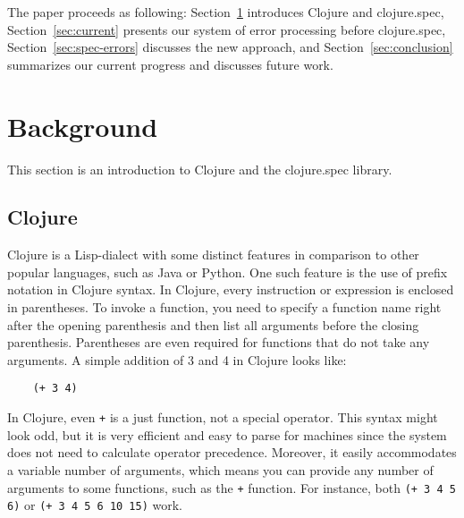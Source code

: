 \documentclass[12pt]{article}
\newcommand{\comment}[1]{{\bf \tt  {#1}}}
\newcommand{\emcomment}[1]{\textcolor{ForestGreen}{\comment{Elena: {#1}}}}
\newcommand{\tscomment}[1]{\textcolor{Teal}{\comment{Tony: {#1}}}}
\begin{document}
The paper proceeds as following: Section~\ref{sec:background} introduces Clojure and clojure.spec, 
Section~\ref{sec:current} presents our system of error processing before clojure.spec, 
Section~\ref{sec:spec-errors} discusses the new approach, and Section~\ref{sec:conclusion} summarizes our 
current progress and discusses future work. 

\section{Background}\label{sec:background}
	This section is an introduction to Clojure and the clojure.spec library. 
	\subsection{Clojure}\label{sec:clojure}
	Clojure is a Lisp-dialect with some distinct features in comparison to other popular languages, such as Java or Python.
	One such feature is the use of prefix notation in Clojure syntax. In Clojure, every instruction or expression is enclosed in parentheses.
	To invoke a function, you need to specify a function name right after the opening parenthesis and then list all arguments before the 
	closing parenthesis. Parentheses are even required for functions that do not take any arguments.  
	A simple addition of 3 and 4 in Clojure looks like: 
	\begin{verbatim}
	(+ 3 4)
	\end{verbatim}
	In Clojure, even \texttt{+} is a just function, not a special operator. This syntax might look odd, but it is very efficient and easy to parse for machines since the system does not need to 
	calculate operator precedence. Moreover, it easily accommodates a variable number of arguments, which means
	you can provide any number of arguments to some functions, such as the {\tt +} function. For instance,  both {\tt (+ 3 4 5 6)}
	or {\tt (+ 3 4 5 6 10 15)} work.
	
\end{document}
